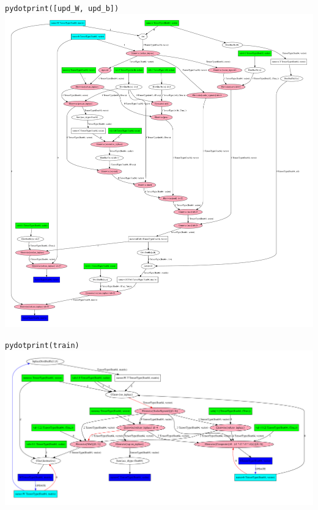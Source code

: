 \documentclass[a4paper,9pt]{beamer}
\begin{document}
\begin{frame}{\texttt{pydotprint([upd\_W, upd\_b])}}
    \center
    \includegraphics[height=0.9\textheight]{pydotprint_upd.pdf}
\end{frame}

\begin{frame}{\texttt{pydotprint(train)}}
    \center
    \includegraphics[width=\textwidth]{pydotprint_train.pdf}
\end{frame}
\end{document}
